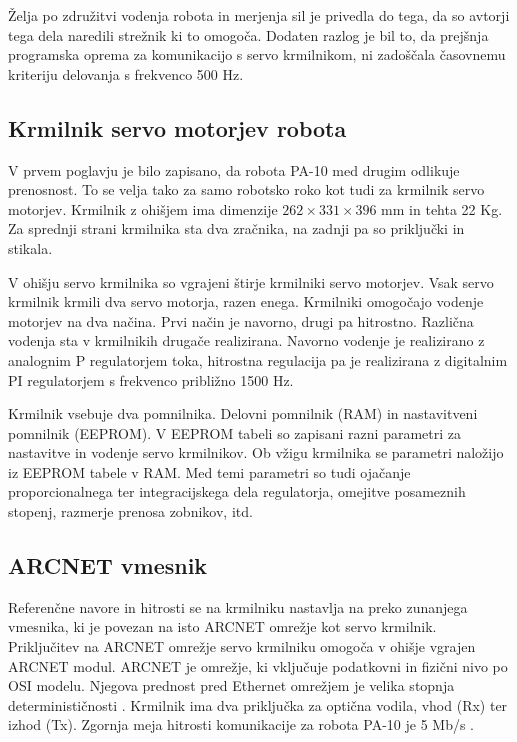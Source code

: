 \documentclass[a4paper]{article}
\begin{document}
Želja po združitvi vodenja robota in merjenja sil je privedla do tega, da so avtorji tega dela naredili strežnik ki to omogoča. Dodaten razlog je bil to, da prejšnja programska oprema za komunikacijo s servo krmilnikom, ni zadoščala časovnemu kriteriju delovanja s frekvenco 500 Hz.

\subsection{Krmilnik servo motorjev robota} \label{sec:servo-drive}

V prvem poglavju je bilo zapisano, da robota PA-10 med drugim odlikuje prenosnost. To se velja tako za samo robotsko roko kot tudi za krmilnik servo motorjev. Krmilnik z ohišjem ima dimenzije $262 \times 331 \times 396$ mm in tehta 22 Kg. Za sprednji strani krmilnika sta dva zračnika, na zadnji pa so priključki in stikala.

%

V ohišju servo krmilnika so vgrajeni štirje krmilniki servo motorjev. Vsak servo krmilnik krmili dva servo motorja, razen enega. Krmilniki omogočajo vodenje motorjev na dva načina. Prvi način je navorno, drugi pa hitrostno. Različna vodenja sta v krmilnikih drugače realizirana. Navorno vodenje je realizirano z analognim P regulatorjem toka, hitrostna regulacija pa je realizirana z digitalnim PI regulatorjem s frekvenco približno 1500 Hz.

Krmilnik vsebuje dva pomnilnika. Delovni pomnilnik (RAM) in nastavitveni pomnilnik (EEPROM). V EEPROM tabeli so zapisani razni parametri za nastavitve in vodenje servo krmilnikov. Ob vžigu krmilnika se parametri naložijo iz EEPROM tabele v RAM. Med temi parametri so tudi ojačanje proporcionalnega ter integracijskega dela regulatorja, omejitve posameznih stopenj, razmerje prenosa zobnikov, itd.

\subsection{ARCNET vmesnik}\label{sec:arc_drive}

Referenčne navore in hitrosti se na krmilniku nastavlja na preko zunanjega vmesnika, ki je povezan na isto ARCNET omrežje kot servo krmilnik. Priključitev na ARCNET omrežje servo krmilniku omogoča v ohišje vgrajen ARCNET modul. ARCNET je omrežje, ki vključuje podatkovni in fizični nivo po OSI modelu. Njegova prednost pred Ethernet omrežjem je velika stopnja determinističnosti \cite{arc_tutorial}. Krmilnik ima dva priključka za optična 
vodila, vhod (Rx) ter izhod (Tx). Zgornja meja hitrosti komunikacije za robota PA-10 je 5 Mb/s \cite{pa10-manual}.
\end{document}
